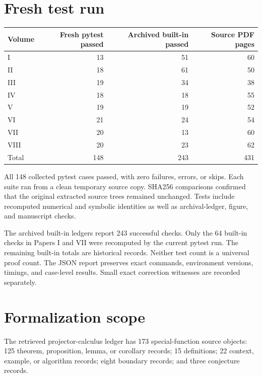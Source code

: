 \section{Fresh test run}

\begin{center}
\begin{tabular}{lrrr}
\toprule
Volume & Fresh pytest passed & Archived built-in passed & Source PDF pages\\
\midrule
I & 13 & 51 & 60\\
II & 18 & 61 & 50\\
III & 19 & 34 & 38\\
IV & 18 & 18 & 55\\
V & 19 & 19 & 52\\
VI & 21 & 24 & 54\\
VII & 20 & 13 & 60\\
VIII & 20 & 23 & 62\\
\midrule
Total & 148 & 243 & 431\\
\bottomrule
\end{tabular}
\end{center}

All 148 collected pytest cases passed, with zero failures, errors, or skips. Each suite ran from a clean temporary source copy. SHA256 comparisons confirmed that the original extracted source trees remained unchanged. Tests include recomputed numerical and symbolic identities as well as archival-ledger, figure, and manuscript checks.

The archived built-in ledgers report 243 successful checks. Only the 64 built-in checks in Papers I and VII were recomputed by the current pytest run. The remaining built-in totals are historical records. Neither test count is a universal proof count. The JSON report preserves exact commands, environment versions, timings, and case-level results. Small exact correction witnesses are recorded separately.

\section{Formalization scope}

The retrieved projector-calculus ledger has 173 special-function source objects: 125 theorem, proposition, lemma, or corollary records; 15 definitions; 22 context, example, or algorithm records; eight boundary records; and three conjecture records.

